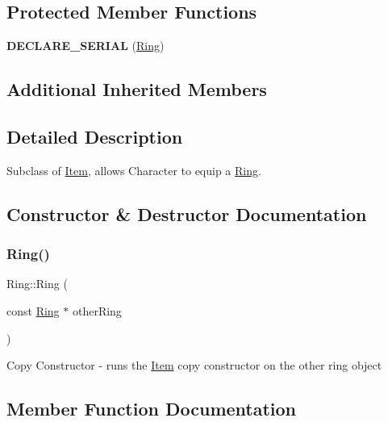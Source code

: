 \subsection*{Protected Member Functions}
\begin{DoxyCompactItemize}
\item 
\hypertarget{class_ring_a46159bcedc7cf0fc72eec5d75784bed9}{}\label{class_ring_a46159bcedc7cf0fc72eec5d75784bed9} 
{\bfseries D\+E\+C\+L\+A\+R\+E\+\_\+\+S\+E\+R\+I\+AL} (\hyperlink{class_ring}{Ring})
\end{DoxyCompactItemize}
\subsection*{Additional Inherited Members}


\subsection{Detailed Description}
Subclass of \hyperlink{class_item}{Item}, allows Character to equip a \hyperlink{class_ring}{Ring}. 

\subsection{Constructor \& Destructor Documentation}
\hypertarget{class_ring_ab65389fd4a0837c0f82a1b9207ba8330}{}\label{class_ring_ab65389fd4a0837c0f82a1b9207ba8330} 
\subsubsection{\texorpdfstring{Ring()}{Ring()}}
{\footnotesize\ttfamily Ring\+::\+Ring (\begin{DoxyParamCaption}\item[{const \hyperlink{class_ring}{Ring} $\ast$}]{other\+Ring }\end{DoxyParamCaption})}

Copy Constructor -\/ runs the \hyperlink{class_item}{Item} copy constructor on the other ring object 

\subsection{Member Function Documentation}
\hypertarget{class_ring_a123e40607e2aa46b27da2228af73eb4a}{}\label{class_ring_a123e40607e2aa46b27da2228af73eb4a} 

